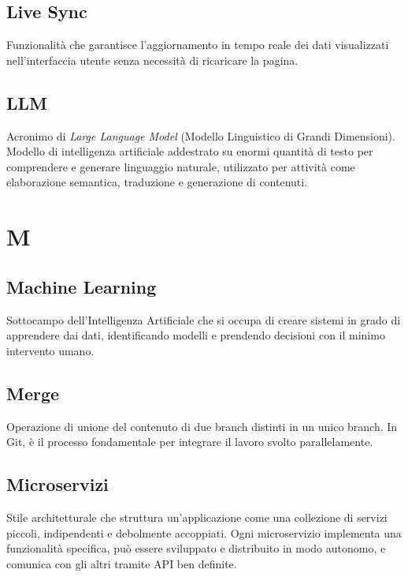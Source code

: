 \documentclass[a4paper, 11pt, oneside]{scrartcl} %
\begin{document}
\subsection*{Live Sync}
Funzionalità che garantisce l'aggiornamento in tempo reale dei dati visualizzati nell'interfaccia utente senza necessità di ricaricare la pagina.
\vspace{0.5cm}

\subsection*{LLM}
Acronimo di \textit{Large Language Model} (Modello Linguistico di Grandi Dimensioni). Modello di intelligenza artificiale addestrato su enormi quantità di testo per comprendere e generare linguaggio naturale, utilizzato per attività come elaborazione semantica, traduzione e generazione di contenuti.
\vspace{0.5cm}


\section*{M}


\subsection*{Machine Learning}
Sottocampo dell'Intelligenza Artificiale che si occupa di creare sistemi in grado di apprendere dai dati, identificando modelli e prendendo decisioni con il minimo intervento umano.
\vspace{0.5cm}

\subsection*{Merge}
Operazione di unione del contenuto di due branch distinti in un unico branch. In Git, è il processo fondamentale per integrare il lavoro svolto parallelamente.
\vspace{0.5cm}

\subsection*{Microservizi}
Stile architetturale che struttura un'applicazione come una collezione di servizi piccoli, indipendenti e debolmente accoppiati. Ogni microservizio implementa una funzionalità specifica, può essere sviluppato e distribuito in modo autonomo, e comunica con gli altri tramite API ben definite.
\vspace{0.5cm}
\end{document}
